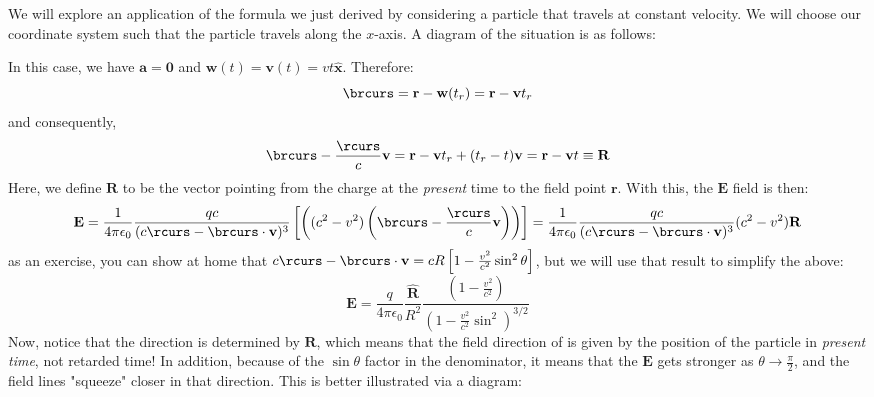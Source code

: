\begin{example}
	We will explore an application of the formula we just derived by considering a particle that travels at
	constant velocity. We will choose our coordinate system such that the particle travels along the \( x
	\)-axis. A diagram of the situation is as follows:
	\begin{center}
	\end{center}
	In this case, we have \( \mathbf{a} = \mathbf{0} \) and \( \mathbf{w}(t) = \mathbf{v}(t) = vt
	\mathbf{\hat{x}} \). Therefore:
	\[
		\brcurs = \mathbf{r} - \mathbf{w}(t_r) = \mathbf{r} - \mathbf{v} t_r
	\]
	and consequently,
	\[
		\brcurs - \frac{\rcurs}{c}\mathbf{v} = \mathbf{r} - \mathbf{v} t_r + (t_r - t) \mathbf{v} =
		\mathbf{r} - \mathbf{v} t \equiv \mathbf{R}
	\]
	Here, we define \( \mathbf{R} \) to be the vector pointing from the charge at the \textit{present} time
	to the field point \( \mathbf{r} \). With this, the \( \mathbf{E} \) field is then:
	\[
		\mathbf{E} = \frac{1}{4\pi \epsilon_0} \frac{qc}{(c \rcurs - \brcurs \cdot \mathbf{v})^3}\left[
		\left( (c^2 - v^2)\left( \brcurs - \frac{\rcurs}{c}\mathbf{v} \right)  \right) \right] =
		\frac{1}{4\pi \epsilon_0} \frac{qc}{(c\rcurs - \brcurs \cdot \mathbf{v})^3} (c^2 - v^2) \mathbf{R}
	\]
	as an exercise, you can show at home that \( c \rcurs - \brcurs \cdot \mathbf{v} = cR\left[ 1 -
	\frac{v^2}{c^2}\sin^2 \theta \right] \), but we will use that result to simplify the above:
	\[
		\mathbf{E} = \frac{q}{4\pi \epsilon_0} \frac{\mathbf{\hat{R}}}{R^2} \frac{\left( 1 - \frac{v^2}{c^2}
		\right)}{\left( 1 - \frac{v^2}{c^2} \sin^2 \right)^{3 / 2}}
	\]
	Now, notice that the direction is determined by \( \mathbf{R} \), which means that the field direction of
	is given by the position of the particle in \textit{present time}, not retarded time! In addition,
	because of the \( \sin \theta \) factor in the denominator, it means that the \( \mathbf{E} \) gets
	stronger as \( \theta \to \frac{\pi}{2} \), and the field lines "squeeze" closer in that direction. This
	is better illustrated via a diagram:
	\begin{center}
\end{center}
\end{example}

